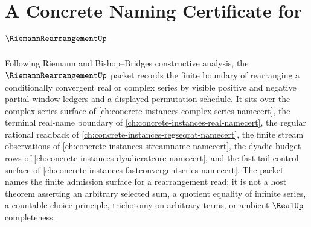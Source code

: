 \chapter{A Concrete Naming Certificate for $\RiemannRearrangementUp$}
\label{ch:concrete-instances-riemann-rearrangement-namecert}

Following Riemann and Bishop--Bridges constructive analysis, the $\RiemannRearrangementUp$ packet records the finite boundary of rearranging a conditionally convergent real or complex series by visible positive and negative partial-window ledgers and a displayed permutation schedule. It sits over the complex-series surface of \autoref{ch:concrete-instances-complex-series-namecert}, the terminal real-name boundary of \autoref{ch:concrete-instances-real-namecert}, the regular rational readback of \autoref{ch:concrete-instances-regseqrat-namecert}, the finite stream observations of \autoref{ch:concrete-instances-streamname-namecert}, the dyadic budget rows of \autoref{ch:concrete-instances-dyadicratcore-namecert}, and the fast tail-control surface of \autoref{ch:concrete-instances-fastconvergentseries-namecert}. The packet names the finite admission surface for a rearrangement read; it is not a host theorem asserting an arbitrary selected sum, a quotient equality of infinite series, a countable-choice principle, trichotomy on arbitrary terms, or ambient $\RealUp$ completeness.

